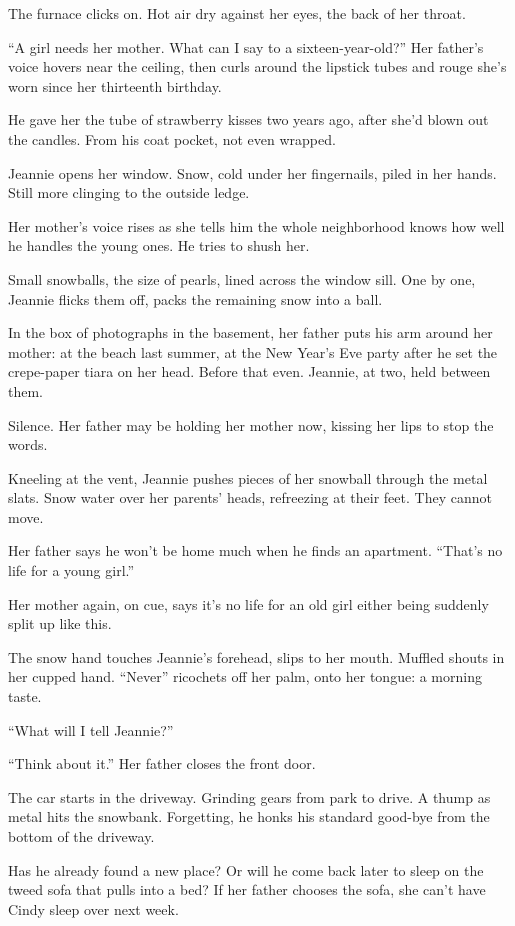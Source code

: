 \documentclass[
]{article}
\begin{document}
The furnace clicks on. Hot air dry against her eyes, the back of her
throat.

``A girl needs her mother. What can I say to a sixteen-year-old?'' Her
father's voice hovers near the ceiling, then curls around the lipstick
tubes and rouge she's worn since her thirteenth birthday.

He gave her the tube of strawberry kisses two years ago, after she'd
blown out the candles. From his coat pocket, not even wrapped.

Jeannie opens her window. Snow, cold under her fingernails, piled in her
hands. Still more clinging to the outside ledge.

Her mother's voice rises as she tells him the whole neighborhood knows
how well he handles the young ones. He tries to shush her.

Small snowballs, the size of pearls, lined across the window sill. One
by one, Jeannie flicks them off, packs the remaining snow into a ball.

In the box of photographs in the basement, her father puts his arm
around her mother: at the beach last summer, at the New Year's Eve party
after he set the crepe-paper tiara on her head. Before that even.
Jeannie, at two, held between them.

Silence. Her father may be holding her mother now, kissing her lips to
stop the words.

Kneeling at the vent, Jeannie pushes pieces of her snowball through the
metal slats. Snow water over her parents' heads, refreezing at their
feet. They cannot move.

Her father says he won't be home much when he finds an apartment.
``That's no life for a young girl.''

Her mother again, on cue, says it's no life for an old girl either being
suddenly split up like this.

The snow hand touches Jeannie's forehead, slips to her mouth. Muffled
shouts in her cupped hand. ``Never'' ricochets off her palm, onto her
tongue: a morning taste.

``What will I tell Jeannie?''

``Think about it.'' Her father closes the front door.

The car starts in the driveway. Grinding gears from park to drive. A
thump as metal hits the snowbank. Forgetting, he honks his standard
good-bye from the bottom of the driveway.

Has he already found a new place? Or will he come back later to sleep on
the tweed sofa that pulls into a bed? If her father chooses the sofa,
she can't have Cindy sleep over next week.
\end{document}
